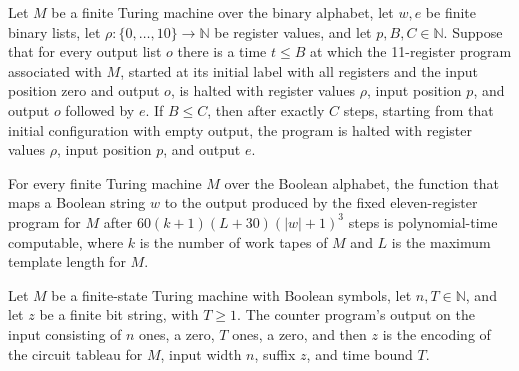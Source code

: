 \begin{theorem}
\label{Complexity.UTab.run_budget}
\leanok
{}
Let $M$ be a finite Turing machine over the binary alphabet, let $w,e$ be finite binary
lists, let $\rho:\{0,\ldots,10\}\to\mathbb{N}$ be register values, and let
$p,B,C\in\mathbb{N}$. Suppose that for every output list $o$ there is a time $t\le B$ at
which the 11-register program associated with $M$, started at its initial label with all
registers and the input position zero and output $o$, is halted with register values
$\rho$, input position $p$, and output $o$ followed by $e$. If $B\le C$, then after
exactly $C$ steps, starting from that initial configuration with empty output, the
program is halted with register values $\rho$, input position $p$, and output $e$.
\end{theorem}

\begin{theorem}
\label{Complexity.UTab.polyTimeComputable_tabEmit}
\leanok
{}
For every finite Turing machine $M$ over the Boolean alphabet, the function that maps a
Boolean string $w$ to the output produced by the fixed eleven-register program for $M$
after $60(k+1)(L+30)(|w|+1)^3$ steps is polynomial-time computable, where $k$ is the
number of work tapes of $M$ and $L$ is the maximum template length for $M$.
\end{theorem}

\begin{theorem}
\label{Complexity.UTab.tabEmit_eq}
\leanok
{}
Let $M$ be a finite-state Turing machine with Boolean symbols, let $n,T\in\mathbb{N}$,
and let $z$ be a finite bit string, with $T\geq 1$. The counter program's output on the
input consisting of $n$ ones, a zero, $T$ ones, a zero, and then $z$ is the encoding of
the circuit tableau for $M$, input width $n$, suffix $z$, and time bound $T$.
\end{theorem}
